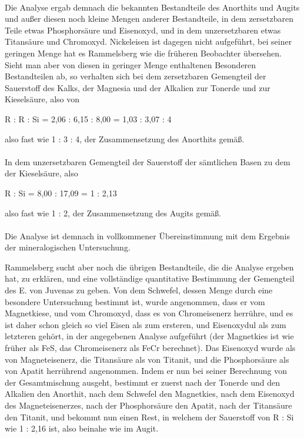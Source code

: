 \documentclass[a4paper, 11pt, oneside]{article}
\begin{document}
\paragraph{}
Die Analyse ergab demnach die bekannten Bestandteile des Anorthits und Augits und außer diesen noch kleine Mengen anderer Bestandteile, in dem zersetzbaren Teile etwas Phosphorsäure und Eisenoxyd, und in dem unzersetzbaren etwas Titansäure und Chromoxyd. Nickeleisen ist dagegen nicht aufgeführt, bei seiner geringen Menge hat es Rammelsberg wie die früheren Beobachter übersehen. Sieht man aber von diesen in geringer Menge enthaltenen Besonderen Bestandteilen ab, so verhalten sich bei dem zersetzbaren Gemengteil der Sauerstoff des Kalks, der Magnesia und der Alkalien zur Tonerde und zur Kieselsäure, also von
\begin{center}
R : R : Si = 2,06 : 6,15 : 8,00 = 1,03 : 3,07 : 4
\end{center}
also fast wie 1 : 3 : 4, der Zusammensetzung des Anorthits gemäß.
\paragraph{}
In dem unzersetzbaren Gemengteil der Sauerstoff der sämtlichen Basen zu dem der Kieselsäure, also
\begin{center}
R : Si = 8,00 : 17,09 = 1 : 2,13
\end{center}
also fast wie 1 : 2, der Zusammensetzung des Augits gemäß.
\paragraph{}
Die Analyse ist demnach in vollkommener Übereinstimmung mit dem Ergebnis der mineralogischen Untersuchung.

Rammelsberg sucht aber noch die übrigen Bestandteile, die die Analyse ergeben hat, zu erklären, und eine vollständige quantitative Bestimmung der Gemengteil des E. von Juvenas zu geben. Von dem Schwefel, dessen Menge durch eine besondere Untersuchung bestimmt ist, wurde angenommen, dass er vom Magnetkiese, und vom Chromoxyd, dass es von Chromeisenerz herrühre, und es ist daher schon gleich so viel Eisen als zum ersteren, und Eisenoxydul als zum letzteren gehört, in der angegebenen Analyse aufgeführt (der Magnetkies ist wie früher als FeS, das Chromeisenerz als FeCr berechnet). Das Eisenoxyd wurde als von Magneteisenerz, die Titansäure als von Titanit, und die Phosphorsäure als von Apatit herrührend angenommen. Indem er nun bei seiner Berechnung von der Gesamtmischung ausgeht, bestimmt er zuerst nach der Tonerde und den Alkalien den Anorthit, nach dem Schwefel den Magnetkies, nach dem Eisenoxyd des Magneteisenerzes, nach der Phosphorsäure den Apatit, nach der Titansäure den Titanit, und bekommt nun einen Rest, in welchem der Sauerstoff von R : Si wie 1 : 2,16 ist, also beinahe wie im Augit.
\end{document}
